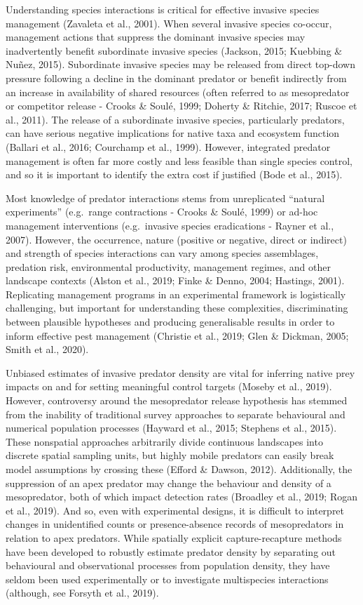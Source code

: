 \documentclass[]{elsarticle} %
\begin{document}
Understanding species interactions is critical for effective invasive species management (Zavaleta et al., 2001).
When several invasive species co-occur, management actions that suppress the dominant invasive species may inadvertently benefit subordinate invasive species (Jackson, 2015; Kuebbing \& Nuñez, 2015).
Subordinate invasive species may be released from direct top-down pressure following a decline in the dominant predator or benefit indirectly from an increase in availability of shared resources (often referred to as mesopredator or competitor release - Crooks \& Soulé, 1999; Doherty \& Ritchie, 2017; Ruscoe et al., 2011).
The release of a subordinate invasive species, particularly predators, can have serious negative implications for native taxa and ecosystem function (Ballari et al., 2016; Courchamp et al., 1999).
However, integrated predator management is often far more costly and less feasible than single species control, and so it is important to identify the extra cost if justified (Bode et al., 2015).

Most knowledge of predator interactions stems from unreplicated ``natural experiments'' (e.g.~range contractions - Crooks \& Soulé, 1999) or ad-hoc management interventions (e.g.~invasive species eradications - Rayner et al., 2007).
However, the occurrence, nature (positive or negative, direct or indirect) and strength of species interactions can vary among species assemblages, predation risk, environmental productivity, management regimes, and other landscape contexts (Alston et al., 2019; Finke \& Denno, 2004; Hastings, 2001).
Replicating management programs in an experimental framework is logistically challenging, but important for understanding these complexities, discriminating between plausible hypotheses and producing generalisable results in order to inform effective pest management (Christie et al., 2019; Glen \& Dickman, 2005; Smith et al., 2020).

Unbiased estimates of invasive predator density are vital for inferring native prey impacts on and for setting meaningful control targets (Moseby et al., 2019). However, controversy around the mesopredator release hypothesis has stemmed from the inability of traditional survey approaches to separate behavioural and numerical population processes (Hayward et al., 2015; Stephens et al., 2015).
These nonspatial approaches arbitrarily divide continuous landscapes into discrete spatial sampling units, but highly mobile predators can easily break model assumptions by crossing these (Efford \& Dawson, 2012).
Additionally, the suppression of an apex predator may change the behaviour and density of a mesopredator, both of which impact detection rates (Broadley et al., 2019; Rogan et al., 2019).
And so, even with experimental designs, it is difficult to interpret changes in unidentified counts or presence-absence records of mesopredators in relation to apex predators.
While spatially explicit capture-recapture methods have been developed to robustly estimate predator density by separating out behavioural and observational processes from population density, they have seldom been used experimentally or to investigate multispecies interactions (although, see Forsyth et al., 2019).
\end{document}
